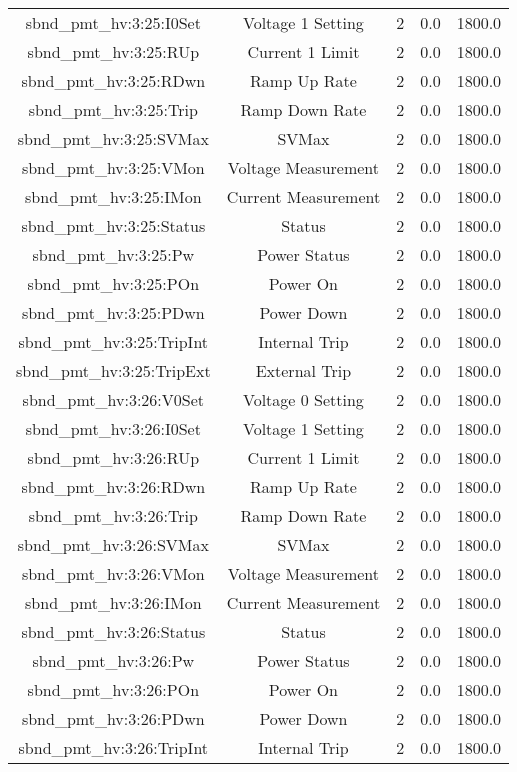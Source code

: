 \begin{center}
\begin{longtable}{c | c c c c }
sbnd\_pmt\_hv:3:25:I0Set & Voltage 1 Setting & 2 & 0.0 & 1800.0\\ 
sbnd\_pmt\_hv:3:25:RUp & Current 1 Limit & 2 & 0.0 & 1800.0\\ 
sbnd\_pmt\_hv:3:25:RDwn & Ramp Up Rate & 2 & 0.0 & 1800.0\\ 
sbnd\_pmt\_hv:3:25:Trip & Ramp Down Rate & 2 & 0.0 & 1800.0\\ 
sbnd\_pmt\_hv:3:25:SVMax & SVMax & 2 & 0.0 & 1800.0\\ 
sbnd\_pmt\_hv:3:25:VMon & Voltage Measurement & 2 & 0.0 & 1800.0\\ 
sbnd\_pmt\_hv:3:25:IMon & Current Measurement & 2 & 0.0 & 1800.0\\ 
sbnd\_pmt\_hv:3:25:Status & Status & 2 & 0.0 & 1800.0\\ 
sbnd\_pmt\_hv:3:25:Pw & Power Status & 2 & 0.0 & 1800.0\\ 
sbnd\_pmt\_hv:3:25:POn & Power On & 2 & 0.0 & 1800.0\\ 
sbnd\_pmt\_hv:3:25:PDwn & Power Down & 2 & 0.0 & 1800.0\\ 
sbnd\_pmt\_hv:3:25:TripInt & Internal Trip & 2 & 0.0 & 1800.0\\ 
sbnd\_pmt\_hv:3:25:TripExt & External Trip & 2 & 0.0 & 1800.0\\ 
sbnd\_pmt\_hv:3:26:V0Set & Voltage 0 Setting & 2 & 0.0 & 1800.0\\ 
sbnd\_pmt\_hv:3:26:I0Set & Voltage 1 Setting & 2 & 0.0 & 1800.0\\ 
sbnd\_pmt\_hv:3:26:RUp & Current 1 Limit & 2 & 0.0 & 1800.0\\ 
sbnd\_pmt\_hv:3:26:RDwn & Ramp Up Rate & 2 & 0.0 & 1800.0\\ 
sbnd\_pmt\_hv:3:26:Trip & Ramp Down Rate & 2 & 0.0 & 1800.0\\ 
sbnd\_pmt\_hv:3:26:SVMax & SVMax & 2 & 0.0 & 1800.0\\ 
sbnd\_pmt\_hv:3:26:VMon & Voltage Measurement & 2 & 0.0 & 1800.0\\ 
sbnd\_pmt\_hv:3:26:IMon & Current Measurement & 2 & 0.0 & 1800.0\\ 
sbnd\_pmt\_hv:3:26:Status & Status & 2 & 0.0 & 1800.0\\ 
sbnd\_pmt\_hv:3:26:Pw & Power Status & 2 & 0.0 & 1800.0\\ 
sbnd\_pmt\_hv:3:26:POn & Power On & 2 & 0.0 & 1800.0\\ 
sbnd\_pmt\_hv:3:26:PDwn & Power Down & 2 & 0.0 & 1800.0\\ 
sbnd\_pmt\_hv:3:26:TripInt & Internal Trip & 2 & 0.0 & 1800.0\\ 

\end{longtable}
\end{center}
